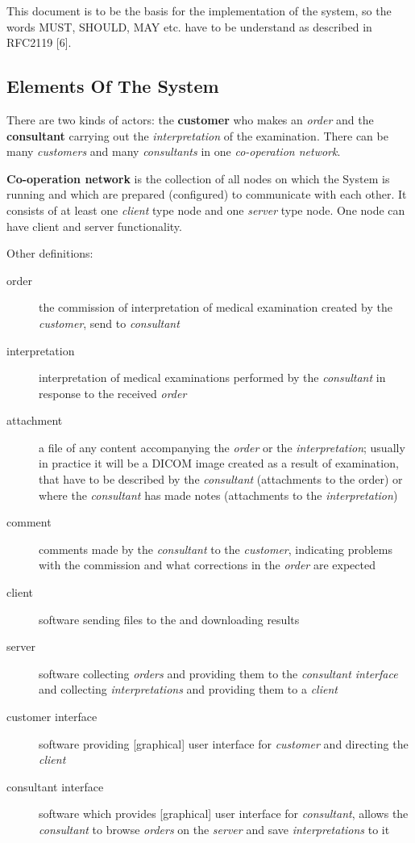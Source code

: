 \documentclass[a4paper]{article}
\begin{document}
This document is to be the basis for the implementation of the system, so the words MUST,
SHOULD, MAY etc. have to be understand as described in RFC2119 [6].

\subsection{Elements Of The System}

There are two kinds of actors: the \textbf{customer} who makes an \emph{order}
and the \textbf{consultant} carrying out the \emph{interpretation} of the examination.
There can be many \emph{customers} and many \emph{consultants} in one \emph{co-operation
network}.

\textbf{Co-operation network} is the collection of all nodes on which the System is
running and which are prepared (configured) to communicate with each other. It consists
of at least one \emph{client} type node and one \emph{server} type node. One node can
have client and server functionality.

Other definitions:
\begin{description}
  \item[order] the commission of interpretation of medical examination created by the
  \emph{customer}, send to \emph{consultant}
  \item[interpretation] interpretation of medical examinations performed by the
  \emph{consultant} in response to the received \emph{order}
  \item[attachment] a file of any content accompanying the \emph{order} or
  the \emph{interpretation}; usually in practice it will be a DICOM image created as a result
  of examination, that have to be described by the \emph{consultant} (attachments to the
  order) or where the \emph{consultant} has made notes (attachments to the
  \emph{interpretation})
  \item[comment] comments made by the \emph{consultant} to the \emph{customer}, indicating
  problems with the commission and what corrections in the \emph{order} are expected
  \item[client] software sending files to the  and downloading
  results
  \item[server] software collecting \emph{orders} and providing them to the
  \emph{consultant interface} and collecting \emph{interpretations} and providing them
  to a \emph{client}
  \item[customer interface] software providing [graphical] user interface for 
  \emph{customer} and directing the \emph{client}
  \item[consultant interface] software which provides [graphical] user interface for
  \emph{consultant}, allows the \emph{consultant} to browse \emph{orders} on the
  \emph{server} and save \emph{interpretations} to it
\end{description}
\end{document}
